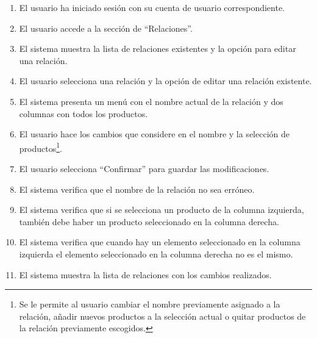 \begin{enumerate}
    \item El usuario ha iniciado sesión con su cuenta de usuario correspondiente.
    \item El usuario accede a la sección de \enquote{Relaciones}.
    \item El sistema muestra la lista de relaciones existentes y la opción para editar una relación.
    \item El usuario selecciona una relación y la opción de editar una relación existente.
    \item El sistema presenta un menú con el nombre actual de la relación y dos columnas con todos los productos.
    \item El usuario hace los cambios que considere en el nombre y la selección de productos\footnote{Se le permite al usuario cambiar el nombre previamente asignado a la relación, añadir nuevos productos a la selección actual o quitar productos de la relación previamente escogidos.}.
    \item El usuario selecciona \enquote{Confirmar} para guardar las modificaciones.
    \item El sistema verifica que el nombre de la relación no sea erróneo.
    \item El sistema verifica que si se selecciona un producto de la columna izquierda, también debe haber un producto seleccionado en la columna derecha.
    \item El sistema verifica que cuando hay un elemento seleccionado en la columna izquierda el elemento seleccionado en la columna derecha no es el mismo.
    \item El sistema muestra la lista de relaciones con los cambios realizados.
\end{enumerate}

